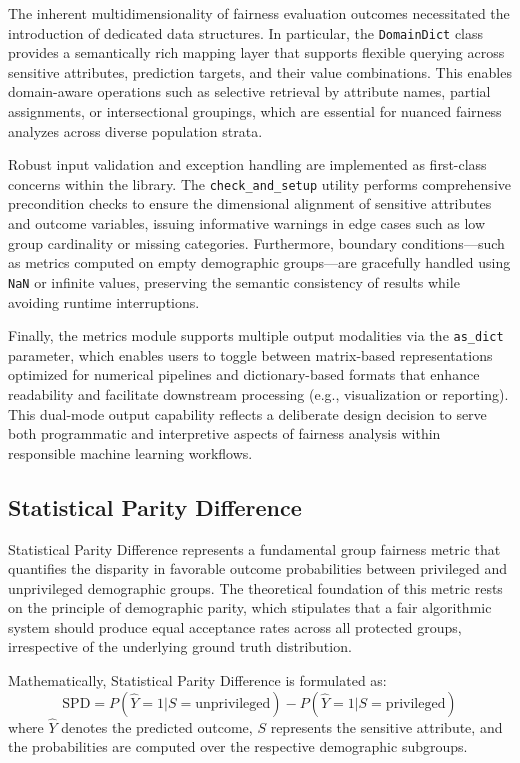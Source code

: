 \documentclass[12pt,a4paper,openright,twoside]{book}
\begin{document}
The inherent multidimensionality of fairness evaluation outcomes necessitated the introduction of dedicated data structures. In particular, the \texttt{DomainDict} class provides a semantically rich mapping layer that supports flexible querying across sensitive attributes, prediction targets, and their value combinations. This enables domain-aware operations such as selective retrieval by attribute names, partial assignments, or intersectional groupings, which are essential for nuanced fairness analyzes across diverse population strata.

Robust input validation and exception handling are implemented as first-class concerns within the library. The \texttt{check\_and\_setup} utility performs comprehensive precondition checks to ensure the dimensional alignment of sensitive attributes and outcome variables, issuing informative warnings in edge cases such as low group cardinality or missing categories. Furthermore, boundary conditions—such as metrics computed on empty demographic groups—are gracefully handled using \texttt{NaN} or infinite values, preserving the semantic consistency of results while avoiding runtime interruptions.

Finally, the metrics module supports multiple output modalities via the \texttt{as\_dict} parameter, which enables users to toggle between matrix-based representations optimized for numerical pipelines and dictionary-based formats that enhance readability and facilitate downstream processing (e.g., visualization or reporting). This dual-mode output capability reflects a deliberate design decision to serve both programmatic and interpretive aspects of fairness analysis within responsible machine learning workflows.


\subsection{Statistical Parity Difference}

Statistical Parity Difference represents a fundamental group fairness metric that quantifies the disparity in favorable outcome probabilities between privileged and unprivileged demographic groups. The theoretical foundation of this metric rests on the principle of demographic parity, which stipulates that a fair algorithmic system should produce equal acceptance rates across all protected groups, irrespective of the underlying ground truth distribution.

Mathematically, Statistical Parity Difference is formulated as:
\begin{equation}
\text{SPD} = P(\hat{Y}=1|S=\text{unprivileged}) - P(\hat{Y}=1|S=\text{privileged})
\end{equation}
where $\hat{Y}$ denotes the predicted outcome, $S$ represents the sensitive attribute, and the probabilities are computed over the respective demographic subgroups.
\end{document}
